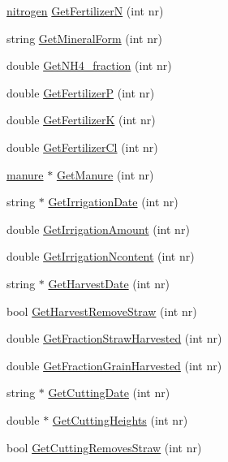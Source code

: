 \begin{DoxyCompactItemize}
\item 
\hyperlink{classnitrogen}{nitrogen} \hyperlink{classfield_order_a4884d59d9c09257541a26b93981e11c5}{GetFertilizerN} (int nr)
\item 
string \hyperlink{classfield_order_aee2cdd7bdc4366285f4773b7ba2845bb}{GetMineralForm} (int nr)
\item 
double \hyperlink{classfield_order_a721cc8a7ea3226cbc025e45d324b4e25}{GetNH4\_\-fraction} (int nr)
\item 
double \hyperlink{classfield_order_aa5a9384e37f887a8496500d0d57962b0}{GetFertilizerP} (int nr)
\item 
double \hyperlink{classfield_order_ac8ab55571fe07deed605e965abcc5488}{GetFertilizerK} (int nr)
\item 
double \hyperlink{classfield_order_a99c1f33e479f580eeda93477700397af}{GetFertilizerCl} (int nr)
\item 
\hyperlink{classmanure}{manure} $\ast$ \hyperlink{classfield_order_ad1fa5fef531ce19102f484b45be51423}{GetManure} (int nr)
\item 
string $\ast$ \hyperlink{classfield_order_a68180d73777b3f44015f6322ab7bd024}{GetIrrigationDate} (int nr)
\item 
double \hyperlink{classfield_order_ab7c35b1c03503ff7db03ed5fd2d9ac46}{GetIrrigationAmount} (int nr)
\item 
double \hyperlink{classfield_order_a4cb48a2ba7e8f33f1a73e4e58adc78e6}{GetIrrigationNcontent} (int nr)
\item 
string $\ast$ \hyperlink{classfield_order_a3dbb54230e3ad3a39867e5ed84ced32d}{GetHarvestDate} (int nr)
\item 
bool \hyperlink{classfield_order_a93718b2f06f6a94b96033039a8de51f5}{GetHarvestRemoveStraw} (int nr)
\item 
double \hyperlink{classfield_order_a111dacdd101cf7a1521cd8d07b17ea9d}{GetFractionStrawHarvested} (int nr)
\item 
double \hyperlink{classfield_order_ad32ce35adafb70bfd58fbe523e92d896}{GetFractionGrainHarvested} (int nr)
\item 
string $\ast$ \hyperlink{classfield_order_a57e54f1af70e4b04e561bb49199b97ea}{GetCuttingDate} (int nr)
\item 
double $\ast$ \hyperlink{classfield_order_a3e16969fe416cd10fd327f19e37194d4}{GetCuttingHeights} (int nr)
\item 
bool \hyperlink{classfield_order_a3e01e230a50a72c66ea11a5f813e8fd6}{GetCuttingRemovesStraw} (int nr)
\item 

\end{DoxyCompactItemize}
